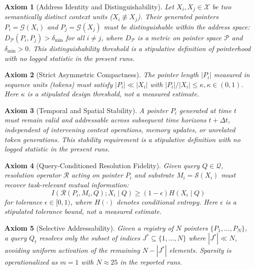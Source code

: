 \documentclass[conference]{IEEEtran}
\newtheorem{axiom}{Axiom}
\begin{document}
\begin{axiom}[Address Identity and Distinguishability]\label{ax:identity}
Let $X_i, X_j \in \mathcal{X}$ be two semantically distinct context units ($X_i \not\equiv X_j$). Their generated pointers $P_i = \mathcal{G}(X_i)$ and $P_j = \mathcal{G}(X_j)$ must be distinguishable within the address space: $D_{\mathcal{P}}(P_i, P_j) > \delta_{\text{min}}$ for all $i \neq j$, where $D_{\mathcal{P}}$ is a metric on pointer space $\mathcal{P}$ and $\delta_{\text{min}} > 0$. This distinguishability threshold is a stipulative definition of pointerhood with no logged statistic in the present runs.
\end{axiom}

\begin{axiom}[Strict Asymmetric Compactness]\label{ax:compactness}
The pointer length $|P_i|$ measured in sequence units (tokens) must satisfy $|P_i| \ll |X_i|$ with $|P_i|/|X_i| \le \kappa, \kappa \in (0, 1)$. Here $\kappa$ is a stipulated design threshold, not a measured estimate.
\end{axiom}

\begin{axiom}[Temporal and Spatial Stability]\label{ax:stability}
A pointer $P_i$ generated at time $t$ must remain valid and addressable across subsequent time horizons $t + \Delta t$, independent of intervening context operations, memory updates, or unrelated token generations. This stability requirement is a stipulative definition with no logged statistic in the present runs.
\end{axiom}

\begin{axiom}[Query-Conditioned Resolution Fidelity]\label{ax:fidelity}
Given query $Q \in \mathcal{Q}$, resolution operator $\mathcal{R}$ acting on pointer $P_i$ and substrate $M_i = \mathcal{S}(X_i)$ must recover task-relevant mutual information:
\begin{equation}
I\left(\mathcal{R}(P_i, M_i, Q); X_i \mid Q\right) \ge (1 - \epsilon) H(X_i \mid Q)
\end{equation}
for tolerance $\epsilon \in [0, 1)$, where $H(\cdot)$ denotes conditional entropy. Here $\epsilon$ is a stipulated tolerance bound, not a measured estimate.
\end{axiom}

\begin{axiom}[Selective Addressability]\label{ax:selectivity}
Given a registry of $N$ pointers $\{P_1, \dots, P_N\}$, a query $Q_t$ resolves only the subset of indices $J^* \subseteq \{1, \dots, N\}$ where $|J^*| \ll N$, avoiding uniform activation of the remaining $N - |J^*|$ elements. Sparsity is operationalized as $m{=}1$ with $N{\approx}25$ in the reported runs.
\end{axiom}
\end{document}
